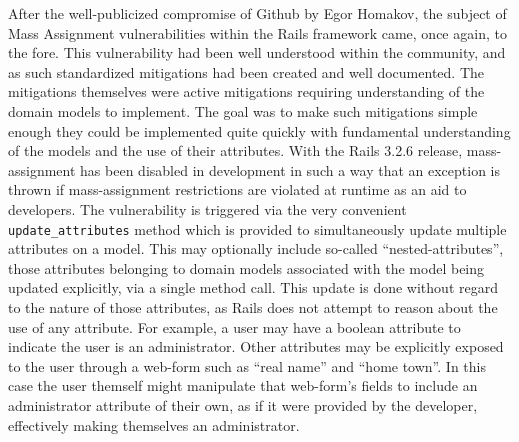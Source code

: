 \documentclass[conference]{IEEEtran}
\begin{document}
After the well-publicized compromise of Github by Egor Homakov\cite{egor}, the subject of
Mass Assignment vulnerabilities within the Rails framework came, once again, to the fore.
This vulnerability had been well understood within the community, and as such standardized
mitigations had been created and well documented.  The mitigations themselves were active
mitigations requiring understanding of the domain models to implement.  The goal was to
make such mitigations simple enough they could be implemented quite quickly with
fundamental understanding of the models and the use of their attributes.  With the Rails
3.2.6 release, mass-assignment has been disabled in development in such a way that an exception
is thrown if mass-assignment restrictions are violated at runtime as an aid to developers.
The vulnerability is triggered via the very convenient \texttt{update\_attributes} method
which is provided to simultaneously update multiple attributes on a model.  This may
optionally include so-called ``nested-attributes'', those attributes belonging to domain
models associated with the model being updated explicitly, via a single method call.  This
update is done without regard to the nature of those attributes, as Rails does not attempt
to reason about the use of any attribute.  For example, a user may have a boolean
attribute to indicate the user is an administrator.  Other attributes may be explicitly
exposed to the user through a web-form such as ``real name'' and ``home town''. In this
case the user themself might manipulate that web-form's fields to include an administrator
attribute of their own, as if it were provided by the developer, effectively making
themselves an administrator.
\end{document}
